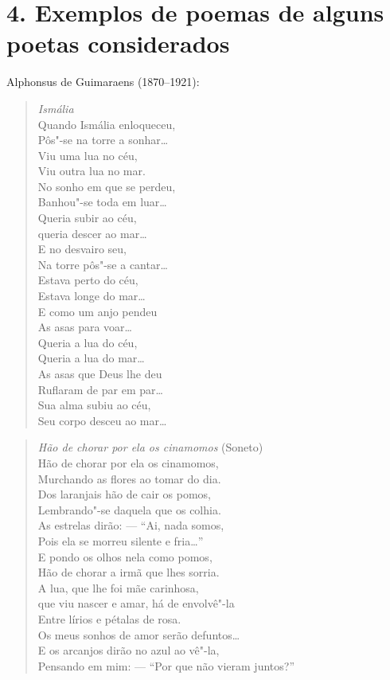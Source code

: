 \section{4. Exemplos de poemas de alguns poetas considerados}


Alphonsus de Guimaraens (1870--1921):

\begin{verse}
\emph{Ismália}\\[8pt]
Quando Ismália enloqueceu,\\
Pôs"-se na torre a sonhar\ldots{}\\
Viu uma lua no céu,\\
Viu outra lua no mar.\\[8pt]
No sonho em que se perdeu,\\
Banhou"-se toda em luar\ldots{}\\
Queria subir ao céu,\\
queria descer ao mar\ldots{}\\[8pt]
E no desvairo seu,\\
Na torre pôs"-se a cantar\ldots{}\\
Estava perto do céu,\\
Estava longe do mar\ldots{}\\[8pt]
E como um anjo pendeu\\
As asas para voar\ldots{}\\
Queria a lua do céu,\\
Queria a lua do mar\ldots{}\\[8pt]
As asas que Deus lhe deu\\
Ruflaram de par em par\ldots\\
Sua alma subiu ao céu,\\
Seu corpo desceu ao mar\ldots{}
\end{verse}

\asterisc

\begin{verse}
\emph{Hão de chorar por ela os cinamomos} (Soneto)\\[8pt]
Hão de chorar por ela os cinamomos,\\
Murchando as flores ao tomar do dia.\\
Dos laranjais hão de cair os pomos,\\
Lembrando"-se daquela que os colhia.\\[8pt]
As estrelas dirão: --- ``Ai, nada somos,\\
Pois ela se morreu silente e fria\ldots{}''\\
E pondo os olhos nela como pomos,\\
Hão de chorar a irmã que lhes sorria.\\[8pt]
A lua, que lhe foi mãe carinhosa,\\
que viu nascer e amar, há de envolvê"-la\\
Entre lírios e pétalas de rosa.\\[8pt]
Os meus sonhos de amor serão defuntos\ldots{}\\
E os arcanjos dirão no azul ao vê"-la,\\
Pensando em mim: --- ``Por que não vieram juntos?''\\
\end{verse}

